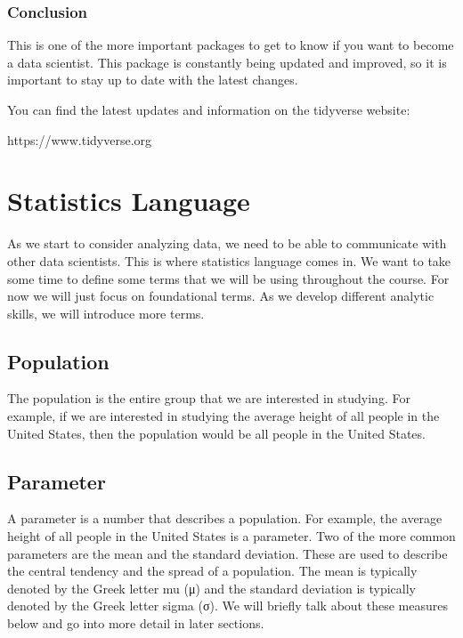 \documentclass[
  letterpaper,
  DIV=11,
  numbers=noendperiod]{scrreprt}
\begin{document}
\subsection*{Conclusion}\label{conclusion}

This is one of the more important packages to get to know if you want to
become a data scientist. This package is constantly being updated and
improved, so it is important to stay up to date with the latest changes.

You can find the latest updates and information on the tidyverse
website:

https://www.tidyverse.org


\chapter*{Statistics Language}\label{statistics-language}


As we start to consider analyzing data, we need to be able to
communicate with other data scientists. This is where statistics
language comes in. We want to take some time to define some terms that
we will be using throughout the course. For now we will just focus on
foundational terms. As we develop different analytic skills, we will
introduce more terms.

\section*{Population}\label{population}


The population is the entire group that we are interested in studying.
For example, if we are interested in studying the average height of all
people in the United States, then the population would be all people in
the United States.

\section*{Parameter}\label{parameter}


A parameter is a number that describes a population. For example, the
average height of all people in the United States is a parameter. Two of
the more common parameters are the mean and the standard deviation.
These are used to describe the central tendency and the spread of a
population. The mean is typically denoted by the Greek letter mu (μ) and
the standard deviation is typically denoted by the Greek letter sigma
(σ). We will briefly talk about these measures below and go into more
detail in later sections.
\end{document}
